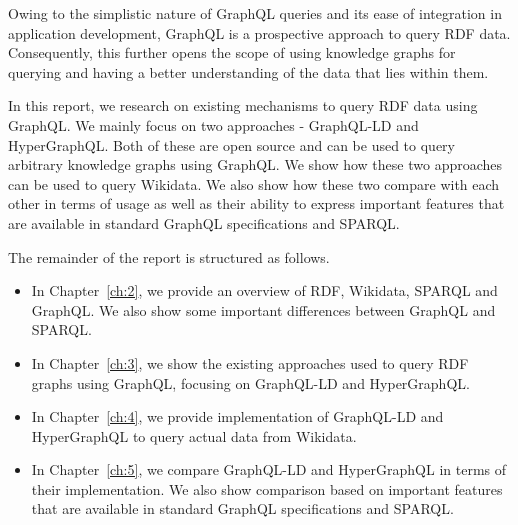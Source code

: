 Owing to the simplistic nature of GraphQL queries and its ease of integration in application development, GraphQL is a prospective approach to query RDF data. Consequently, this further opens the scope of using knowledge graphs for querying and having a better understanding of the data that lies within them.

In this report, we research on existing mechanisms to query RDF data using GraphQL. We mainly focus on two approaches - GraphQL-LD and HyperGraphQL. Both of these are open source and can be used to query arbitrary knowledge graphs using GraphQL. We show how these two approaches can be used to query Wikidata. We also show how these two compare with each other in terms of usage as well as their ability to express important features that are available in standard GraphQL specifications and SPARQL.


The remainder of the report is structured as follows.
\begin{itemize}
	\item In Chapter~\ref{ch:2}, we provide an overview of RDF, Wikidata, SPARQL and GraphQL. We also show some important differences between GraphQL and SPARQL. 
	\item In Chapter~\ref{ch:3}, we show the existing approaches used to query RDF graphs using GraphQL, focusing on GraphQL-LD and HyperGraphQL.
	\item In Chapter~\ref{ch:4}, we provide implementation of GraphQL-LD and HyperGraphQL to query actual data from Wikidata.
	\item In Chapter~\ref{ch:5}, we compare GraphQL-LD and HyperGraphQL in terms of their implementation. We also show comparison based on important features that are available in standard GraphQL specifications and SPARQL.
\end{itemize}